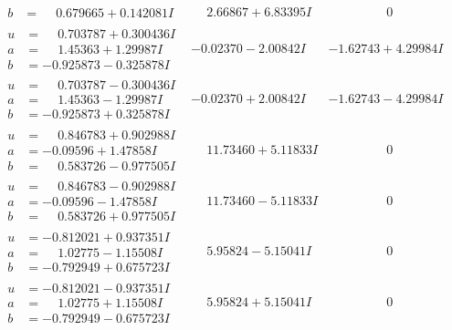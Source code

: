 \documentclass[1p]{elsarticle_modified}
\theoremstyle{definition}
\begin{document}
$$\begin{array}{c|c|c}
\begin{aligned}
b &= \phantom{-}0.679665 + 0.142081 I\end{aligned}
 & \phantom{-}2.66867 + 6.83395 I & \phantom{-0.000000 } 0 \\ \hline\begin{aligned}
u &= \phantom{-}0.703787 + 0.300436 I \\
a &= \phantom{-}1.45363 + 1.29987 I \\
b &= -0.925873 - 0.325878 I\end{aligned}
 & -0.02370 - 2.00842 I & -1.62743 + 4.29984 I \\ \hline\begin{aligned}
u &= \phantom{-}0.703787 - 0.300436 I \\
a &= \phantom{-}1.45363 - 1.29987 I \\
b &= -0.925873 + 0.325878 I\end{aligned}
 & -0.02370 + 2.00842 I & -1.62743 - 4.29984 I \\ \hline\begin{aligned}
u &= \phantom{-}0.846783 + 0.902988 I \\
a &= -0.09596 + 1.47858 I \\
b &= \phantom{-}0.583726 - 0.977505 I\end{aligned}
 & \phantom{-}11.73460 + 5.11833 I & \phantom{-0.000000 } 0 \\ \hline\begin{aligned}
u &= \phantom{-}0.846783 - 0.902988 I \\
a &= -0.09596 - 1.47858 I \\
b &= \phantom{-}0.583726 + 0.977505 I\end{aligned}
 & \phantom{-}11.73460 - 5.11833 I & \phantom{-0.000000 } 0 \\ \hline\begin{aligned}
u &= -0.812021 + 0.937351 I \\
a &= \phantom{-}1.02775 - 1.15508 I \\
b &= -0.792949 + 0.675723 I\end{aligned}
 & \phantom{-}5.95824 - 5.15041 I & \phantom{-0.000000 } 0 \\ \hline\begin{aligned}
u &= -0.812021 - 0.937351 I \\
a &= \phantom{-}1.02775 + 1.15508 I \\
b &= -0.792949 - 0.675723 I\end{aligned}
 & \phantom{-}5.95824 + 5.15041 I & \phantom{-0.000000 } 0 \\ \hline\begin{aligned}

\end{aligned}
\end{array}$$
\end{document}

